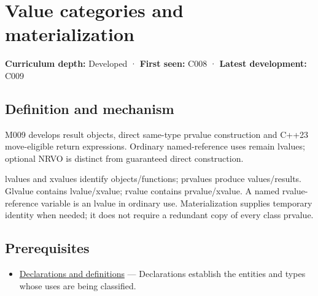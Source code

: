 \hypertarget{appendix-1121b30eaeb0}{}\label{referencestart:appendix-1121b30eaeb0}
\section{Value categories and materialization}\label{appendix-1121b30eaeb0-value-categories-and-materialization}

\hypertarget{appendix-1121b30eaeb0-value-categories-and-materialization}{}

\textbf{Curriculum depth:} Developed · \textbf{First seen:} C008 · \textbf{Latest development:} C009

\begin{allmightroledefinition}

\subsection{Definition and mechanism}\label{appendix-1121b30eaeb0-definition-and-mechanism}

\hypertarget{appendix-1121b30eaeb0-definition-and-mechanism}{}

M009 develops result objects, direct same-type prvalue construction and C++23 move-eligible return expressions. Ordinary named-reference uses remain lvalues; optional NRVO is distinct from guaranteed direct construction.

\end{allmightroledefinition}

lvalues and xvalues identify objects/functions; prvalues produce values/results. Glvalue contains lvalue/xvalue; rvalue contains prvalue/xvalue. A named rvalue-reference variable is an lvalue in ordinary use. Materialization supplies temporary identity when needed; it does not require a redundant copy of every class prvalue.

\subsection{Prerequisites}\label{appendix-1121b30eaeb0-prerequisites}

\hypertarget{appendix-1121b30eaeb0-prerequisites}{}

\begin{itemize}
\tightlist
\item
  \hyperref[appendix-2e4d494c2d94]{Declarations and definitions} --- Declarations establish the entities and types whose uses are being classified.
\end{itemize}

